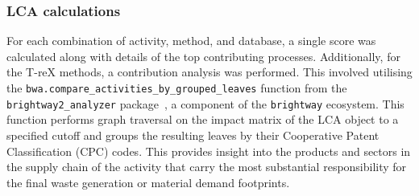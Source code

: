 \subsubsection{LCA calculations}
For each combination of activity, method, and database, a single score was calculated along with details of the top contributing processes. Additionally, for the T-reX methods, a contribution analysis was performed. This involved utilising the \texttt{bwa.compare\_activities\_by\_grouped\_leaves} function from the \texttt{brightway2\_analyzer} package~\citep{mutel2016brightway2analyzer}, a component of the \texttt{brightway} ecosystem. This function performs graph traversal on the impact matrix of the LCA object to a specified cutoff and groups the resulting leaves by their Cooperative Patent Classification (CPC) codes. This provides insight into the products and sectors in the supply chain of the activity that carry the most substantial responsibility for the final waste generation or material demand footprints.


